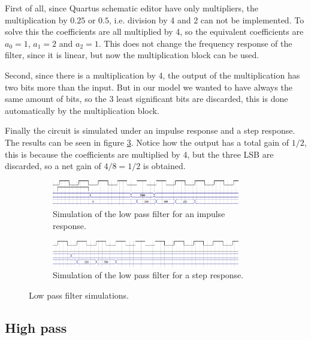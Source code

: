 \documentclass[12pt]{article}   	%
\begin{document}
First of all, since Quartus schematic editor have only multipliers, the multiplication by $0.25$ or $0.5$, i.e. division by 4 and 2 can not be implemented. To solve this the coefficients are all multiplied by 4, so the equivalent coefficients are $a_0=1$, $a_1=2$ and $a_2=1$. This does not change the frequency response of the filter, since it is linear, but now the multiplication block can be used.

Second, since there is a multiplication by 4, the output of the multiplication has two bits more than the input. But in our model we wanted to have always the same amount of bits, so the 3 least significant bits are discarded, this is done automatically by the multiplication block.

Finally the circuit is simulated under an impulse response and a step response. The results can be seen in figure \ref{fig:low_pass_sim}. Notice how the output has a total gain of $1/2$, this is because the coefficients are multiplied by 4, but the three LSB are discarded, so a net gain of $4/8=1/2$ is obtained.

\begin{figure}[htb]
	\centering
	\begin{subfigure}[t]{0.5\textwidth}
		\centering
		\includegraphics[width=0.9\textwidth]{img/lp_sim_imp}
		\caption{Simulation of the low pass filter for an impulse response.}
		\label{fig:lp_sim_imp}
	\end{subfigure}%
	\begin{subfigure}[t]{0.5\textwidth}
	\centering
	\includegraphics[width=0.9\textwidth]{img/lp_sim_step}
	\caption{Simulation of the low pass filter for a step response.}
	\label{fig:lp_sim_step}
\end{subfigure}%
	\caption{Low pass filter simulations.}
	\label{fig:low_pass_sim}
\end{figure}


\subsection{High pass}
\end{document}
